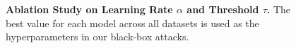 \begin{figure}[t]
    \centering
\caption{\textbf{Ablation Study on Learning Rate $\alpha$ and Threshold $\tau$.} The best value for each model across all datasets is used as the hyperparameters in our black-box attacks.}
\label{fig:ablate_alpha_tau}
\end{figure}

